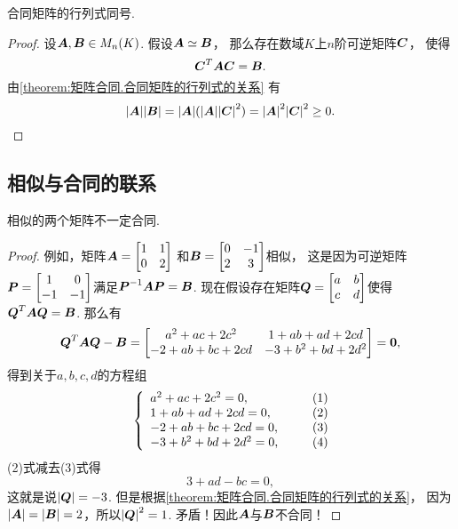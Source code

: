 \begin{proposition}
合同矩阵的行列式同号.
\begin{proof}
设\(\boldsymbol{A},\boldsymbol{B} \in M_n(K)\).
假设\(\boldsymbol{A}\simeq\boldsymbol{B}\)，
那么存在数域\(K\)上\(n\)阶可逆矩阵\(\boldsymbol{C}\)，
使得\[
	\boldsymbol{C}^T \boldsymbol{A} \boldsymbol{C} = \boldsymbol{B}.
\]
由\cref{theorem:矩阵合同.合同矩阵的行列式的关系} 有\[
	\abs{\boldsymbol{A}} \abs{\boldsymbol{B}}
	= \abs{\boldsymbol{A}} (\abs{\boldsymbol{A}} \abs{\boldsymbol{C}}^2)
	= \abs{\boldsymbol{A}}^2 \abs{\boldsymbol{C}}^2
	\geq 0.
	\qedhere
\]
\end{proof}
\end{proposition}

\subsection{相似与合同的联系}
\begin{proposition}
相似的两个矩阵不一定合同.
\begin{proof}
例如，矩阵\(\boldsymbol{A}=\begin{bmatrix}
	1 & 1 \\
	0 & 2
\end{bmatrix}\)
和\(\boldsymbol{B}=\begin{bmatrix}
	0 & -1 \\
	2 & 3
\end{bmatrix}\)相似，
这是因为可逆矩阵\(\boldsymbol{P}=\begin{bmatrix}
	1 & 0 \\
	-1 & -1
\end{bmatrix}\)满足\(\boldsymbol{P}^{-1}\boldsymbol{A}\boldsymbol{P}=\boldsymbol{B}\).
现在假设存在矩阵\(\boldsymbol{Q}=\begin{bmatrix}
	a & b \\
	c & d
\end{bmatrix}\)使得\(\boldsymbol{Q}^T\boldsymbol{A}\boldsymbol{Q}=\boldsymbol{B}\).
那么有\[
	\boldsymbol{Q}^T\boldsymbol{A}\boldsymbol{Q}-\boldsymbol{B}
	=\begin{bmatrix}
		a^2+ac+2c^2 & 1+ab+ad+2cd \\
		-2+ab+bc+2cd & -3+b^2+bd+2d^2
	\end{bmatrix}
	=\boldsymbol0,
\]
得到关于\(a,b,c,d\)的方程组
\begin{align*}
	\left\{ \begin{array}{l}
		a^2+ac+2c^2 = 0, \\
		1+ab+ad+2cd = 0, \\
		-2+ab+bc+2cd = 0, \\
		-3+b^2+bd+2d^2 = 0,
	\end{array} \right.
	\tag*{$\begin{matrix}(1)\\(2)\\(3)\\(4)\end{matrix}$}
\end{align*}
(2)式减去(3)式得\[
	3+ad-bc=0,
\]
这就是说\(\abs{\boldsymbol{Q}}=-3\).
但是根据\cref{theorem:矩阵合同.合同矩阵的行列式的关系}，
因为\(\abs{\boldsymbol{A}}=\abs{\boldsymbol{B}}=2\)，所以\(\abs{\boldsymbol{Q}}^2=1\).
矛盾！因此\(\boldsymbol{A}\)与\(\boldsymbol{B}\)不合同！
\end{proof}
\end{proposition}

